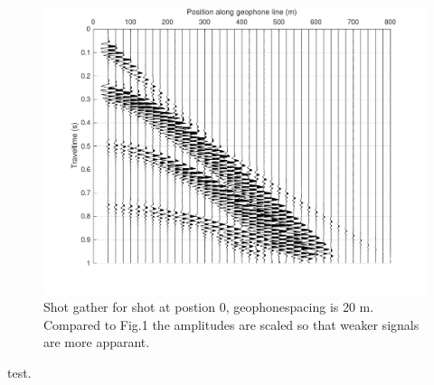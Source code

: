 \pagebreak
\begin{figure}
\includegraphics*[width=\linewidth]{Figures/Seismics/ShotGather_largergain.pdf}
\caption{Shot gather for shot at postion 0, geophonespacing is 20 m. Compared to Fig.1 the amplitudes are scaled so that weaker signals are more apparant.}
\end{figure}
test.
\pagebreak 
\ifanswers
